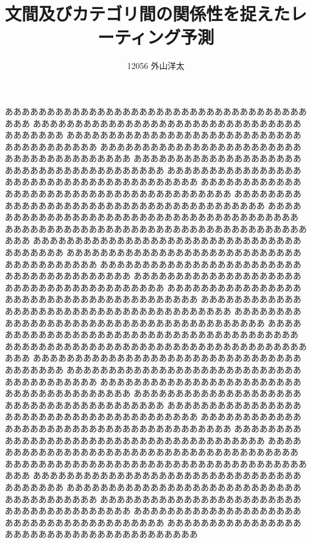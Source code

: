 \documentclass{ttisummary}
\title{文間及びカテゴリ間の関係性を捉えたレーティング予測}
\author{12056 外山洋太}
\begin{document}
あああああああああああああああああああああああああああああああああああああああ
あああああああああああああああああああああああああああああああああああああああ
あああああああああああああああああああああああああああああああああああああああ
あああああああああああああああああああああああああああああああああああああああ
あああああああああああああああああああああああああああああああああああああああ
あああああああああああああああああああああああああああああああああああああああ
あああああああああああああああああああああああああああああああああああああああ
あああああああああああああああああああああああああああああああああああああああ
あああああああああああああああああああああああああああああああああああああああ
あああああああああああああああああああああああああああああああああああああああ
あああああああああああああああああああああああああああああああああああああああ
あああああああああああああああああああああああああああああああああああああああ
あああああああああああああああああああああああああああああああああああああああ
あああああああああああああああああああああああああああああああああああああああ
あああああああああああああああああああああああああああああああああああああああ
あああああああああああああああああああああああああああああああああああああああ
あああああああああああああああああああああああああああああああああああああああ
あああああああああああああああああああああああああああああああああああああああ
あああああああああああああああああああああああああああああああああああああああ
あああああああああああああああああああああああああああああああああああああああ
あああああああああああああああああああああああああああああああああああああああ
あああああああああああああああああああああああああああああああああああああああ
あああああああああああああああああああああああああああああああああああああああ
あああああああああああああああああああああああああああああああああああああああ
あああああああああああああああああああああああああああああああああああああああ
あああああああああああああああああああああああああああああああああああああああ
あああああああああああああああああああああああああああああああああああああああ
あああああああああああああああああああああああああああああああああああああああ
あああああああああああああああああああああああああああああああああああああああ
あああああああああああああああああああああああああああああああああああああああ
あああああああああああああああああああああああああああああああああああああああ
あああああああああああああああああああああああああああああああああああああああ
あああああああああああああああああああああああああああああああああああああああ
\end{document}
